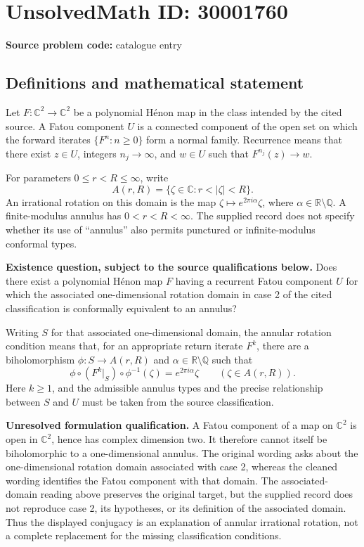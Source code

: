 \documentclass[11pt]{article}
\newcommand{\Q}{\mathbb{Q}}
\newcommand{\R}{\mathbb{R}}
\newcommand{\C}{\mathbb{C}}
\begin{document}
\section*{UnsolvedMath ID: 30001760}
\textbf{Source problem code:} catalogue entry
\subsection{Definitions and mathematical statement}
Let \(F\colon\C^2\to\C^2\) be a polynomial H\'enon map in the class intended by the cited source. A Fatou component \(U\) is a connected component of the open set on which the forward iterates \(\{F^n:n\geq0\}\) form a normal family. Recurrence means that there exist \(z\in U\), integers \(n_j\to\infty\), and \(w\in U\) such that \(F^{n_j}(z)\to w\).

For parameters \(0\leq r<R\leq\infty\), write
\[
A(r,R)=\{\zeta\in\C:r<|\zeta|<R\}.
\]
An irrational rotation on this domain is the map \(\zeta\mapsto e^{2\pi i\alpha}\zeta\), where \(\alpha\in\R\setminus\Q\). A finite-modulus annulus has \(0<r<R<\infty\). The supplied record does not specify whether its use of ``annulus'' also permits punctured or infinite-modulus conformal types.

\textbf{Existence question, subject to the source qualifications below.} Does there exist a polynomial H\'enon map \(F\) having a recurrent Fatou component \(U\) for which the associated one-dimensional rotation domain in case 2 of the cited classification is conformally equivalent to an annulus?

Writing \(S\) for that associated one-dimensional domain, the annular rotation condition means that, for an appropriate return iterate \(F^k\), there are a biholomorphism \(\phi\colon S\to A(r,R)\) and \(\alpha\in\R\setminus\Q\) such that
\[
\phi\circ(F^k|_S)\circ\phi^{-1}(\zeta)
=e^{2\pi i\alpha}\zeta
\qquad(\zeta\in A(r,R)).
\]
Here \(k\geq1\), and the admissible annulus types and the precise relationship between \(S\) and \(U\) must be taken from the source classification.

\textbf{Unresolved formulation qualification.} A Fatou component of a map on \(\C^2\) is open in \(\C^2\), hence has complex dimension two. It therefore cannot itself be biholomorphic to a one-dimensional annulus. The original wording asks about the one-dimensional rotation domain associated with case 2, whereas the cleaned wording identifies the Fatou component with that domain. The associated-domain reading above preserves the original target, but the supplied record does not reproduce case 2, its hypotheses, or its definition of the associated domain. Thus the displayed conjugacy is an explanation of annular irrational rotation, not a complete replacement for the missing classification conditions.
\end{document}
